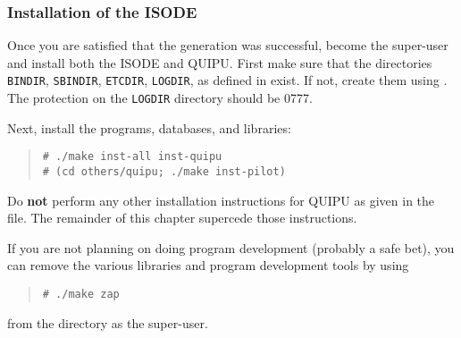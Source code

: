 \subsubsection	{Installation of the ISODE}\label{isode:install}
Once you are satisfied that the generation was successful,
become the super-user and install both the ISODE and QUIPU.
First make sure that the directories \verb"BINDIR",
\verb"SBINDIR",
\verb"ETCDIR",
\verb"LOGDIR",
 as defined in  exist.
If not, create them using .
The protection on the \verb"LOGDIR" directory should be 0777.

Next, install the programs, databases, and libraries:
\begin{quote}\small\begin{verbatim}
# ./make inst-all inst-quipu
# (cd others/quipu; ./make inst-pilot)
\end{verbatim}\end{quote}

Do {\bf not\/} perform any other installation instructions for QUIPU as
given in the  file.
The remainder of this chapter supercede those instructions.

If you are not planning on doing program development (probably a safe bet),
you can remove the various libraries and program development tools by using
\begin{quote}\small\begin{verbatim}
# ./make zap
\end{verbatim}\end{quote}
from the  directory as the super-user.


